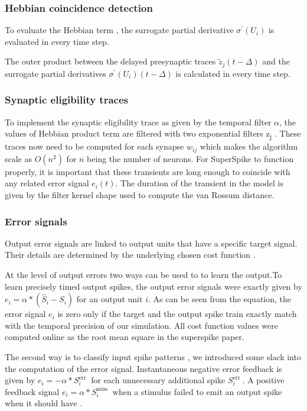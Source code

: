 \documentclass[12pt]{report}
\begin{document}
\subsubsection{Hebbian coincidence detection}
To evaluate the Hebbian term , the surrogate partial derivative $\sigma^{\prime}\left(U_{i}\right)$ is evaluated in every time step. 

The outer product between the delayed presynaptic traces $\tilde{z}_{j}(t-\Delta)$ and the surrogate partial derivatives $\sigma^{\prime}\left(U_{i}\right)(t-\Delta)$ is calculated in every time step.
\subsubsection{Synaptic eligibility traces}
To implement the synaptic eligibility trace as given by the temporal filter $\alpha$, the values of Hebbian product term are filtered with two exponential filters z\textsubscript{j} . These traces now need to be computed for each synapse $w_{i j}$ which makes the algorithm scale as $O\left(n^{2}\right)$ for $n$ being the number of neurons. For SuperSpike to function properly, it is important that these transients are long enough to coincide with any related error signal $e_{i}(t)$. The duration of the transient in the model is given by the filter kernel shape used to compute the van Rossum distance.
\subsubsection{Error signals}
Output error signals are linked to output units that have a specific target signal. Their details are determined by the underlying chosen cost function . 

At the level of output errors two ways can be used to to learn the output.To learn precisely timed output spikes, the output error signals were exactly given by $e_{i}=\alpha *\left(\hat{S}_{i}-S_{i}\right)$ for an output unit $i$. As can be seen from the equation, the error signal $e_{i}$ is zero only if the target and the output spike train exactly match with the temporal precision of our simulation. All cost function values were computed online as the root mean square in the superspike paper.

The second way is to classify input spike patterns , we introduced some slack into the computation of the error signal. Instantaneous negative error feedback is given by $e_{i}=-\alpha * S_{i}^{\text {err }}$ for each unnecessary additional spike $S_{i}^{\text {err }}$. A positive feedback signal $e_{i}=\alpha * S_{i}^{\text {miss }}$ when a stimulus failed to emit an output spike when it should have .
\end{document}
